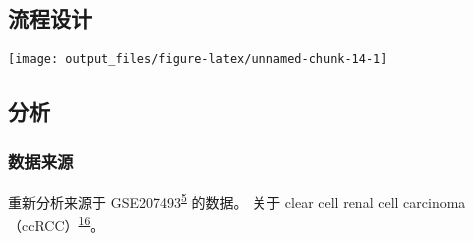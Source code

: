 \documentclass[
]{article}
\begin{document}
\hypertarget{ux6d41ux7a0bux8bbeux8ba1}{%
\subsection{流程设计}\label{ux6d41ux7a0bux8bbeux8ba1}}

\texttt{[image: output\_files/figure-latex/unnamed-chunk-14-1]}

\hypertarget{ux5206ux6790}{%
\subsection{分析}\label{ux5206ux6790}}

\hypertarget{ux6570ux636eux6765ux6e90}{%
\subsubsection{数据来源}\label{ux6570ux636eux6765ux6e90}}

重新分析来源于 GSE207493\textsuperscript{\protect\hyperlink{ref-IntegrativeSinYuZh2023}{5}} 的数据。
关于 clear cell renal cell carcinoma（ccRCC）\textsuperscript{\protect\hyperlink{ref-ClearCellRenaJonasc2020}{16}}。
\end{document}
